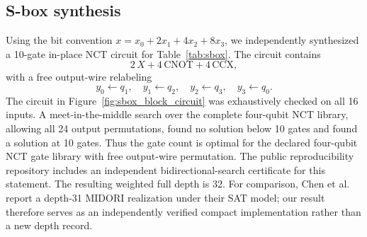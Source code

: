 \documentclass[pdflatex,sn-nature]{sn-jnl}
\theoremstyle{thmstyleone}
\theoremstyle{thmstyletwo}
\begin{document}
\subsection{S-box synthesis}
Using the bit convention $x=x_0+2x_1+4x_2+8x_3$, we independently synthesized a 10-gate in-place NCT circuit for Table~\ref{tab:sbox}. The circuit contains
\begin{equation}
    2\,X + 4\,\mathrm{CNOT} + 4\,\mathrm{CCX},
\end{equation}
with a free output-wire relabeling
\begin{equation}
    y_0\leftarrow q_1,\quad y_1\leftarrow q_2,\quad y_2\leftarrow q_3,\quad y_3\leftarrow q_0.
\end{equation}
The circuit in Figure~\ref{fig:sbox_block_circuit} was exhaustively checked on all 16 inputs. A meet-in-the-middle search over the complete four-qubit NCT library, allowing all 24 output permutations, found no solution below 10 gates and found a solution at 10 gates. Thus the gate count is optimal for the declared four-qubit NCT gate library with free output-wire permutation. The public reproducibility repository includes an independent bidirectional-search certificate for this statement. The resulting weighted full depth is 32. For comparison, Chen et al.~\cite{Chen2024} report a depth-31 MIDORI realization under their SAT model; our result therefore serves as an independently verified compact implementation rather than a new depth record.
\end{document}
